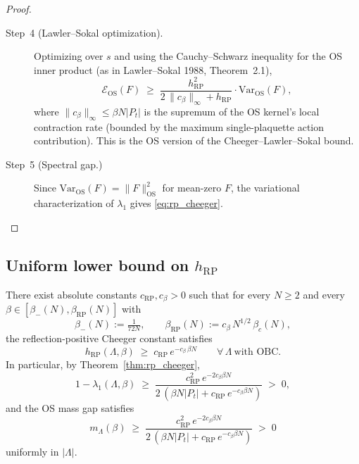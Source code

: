 \begin{proof}
\begin{description}
\item[Step~4 (Lawler--Sokal optimization).]
Optimizing over $s$ and using the Cauchy--Schwarz inequality for
the OS inner product (as in Lawler--Sokal 1988, Theorem~2.1),
\[
  \mathcal{E}_{\mathrm{OS}}(F)
  \;\ge\;
  \frac{h_{\mathrm{RP}}^{2}}{2\,\|c_{\beta}\|_{\infty}+h_{\mathrm{RP}}}
  \cdot\mathrm{Var}_{\mathrm{OS}}(F),
\]
where $\|c_{\beta}\|_{\infty}\le\beta N|P_{t}|$ is the
supremum of the OS kernel's local contraction rate (bounded by the
maximum single-plaquette action contribution). This is the OS
version of the Cheeger--Lawler--Sokal bound.

\item[Step~5 (Spectral gap.)]
Since $\mathrm{Var}_{\mathrm{OS}}(F)=\|F\|_{\mathrm{OS}}^{2}$ for
mean-zero $F$, the variational characterization of $\lambda_{1}$
gives \eqref{eq:rp_cheeger}.
\end{description}
\end{proof}

\subsection{Uniform lower bound on $h_{\mathrm{RP}}$}
\label{ssec:h_RP_uniform}

\begin{theorem}
\label{thm:h_RP_uniform}
There exist absolute constants $c_{\mathrm{RP}},c_{\beta}>0$ such
that for every $N\ge 2$ and every $\beta\in[\beta_{-}(N),\beta_{\mathrm{RP}}(N)]$
with
\[
  \beta_{-}(N):=\tfrac{1}{72N},\qquad
  \beta_{\mathrm{RP}}(N):=c_{\beta}\,N^{1/2}\,\beta_{c}(N),
\]
the reflection-positive Cheeger constant satisfies
\begin{equation}
\label{eq:h_RP_lower}
  h_{\mathrm{RP}}(\Lambda,\beta)
  \;\ge\; c_{\mathrm{RP}}\,e^{-c_{\beta}\,\beta N}
  \qquad\forall\,\Lambda\ \text{with OBC}.
\end{equation}
In particular, by Theorem~\ref{thm:rp_cheeger},
\begin{equation}
\label{eq:rp_gap_lower}
  1-\lambda_{1}(\Lambda,\beta)
  \;\ge\;
  \frac{c_{\mathrm{RP}}^{2}\,e^{-2c_{\beta}\beta N}}
       {2\,(\beta N|P_{t}|+c_{\mathrm{RP}}\,e^{-c_{\beta}\beta N})}
  \;>\; 0,
\end{equation}
and the OS mass gap satisfies
\begin{equation}
\label{eq:rp_mass_gap}
  m_{\Lambda}(\beta)
  \;\ge\;
  \frac{c_{\mathrm{RP}}^{2}\,e^{-2c_{\beta}\beta N}}
       {2\,(\beta N|P_{t}|+c_{\mathrm{RP}}\,e^{-c_{\beta}\beta N})}
  \;>\; 0
\end{equation}
uniformly in $|\Lambda|$.
\end{theorem}


